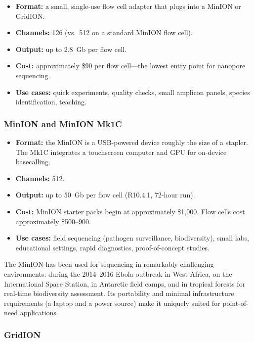 \begin{itemize}[nosep]
  \item \textbf{Format:} a small, single-use flow cell adapter that plugs into a MinION or GridION.
  \item \textbf{Channels:} 126 (vs.\ 512 on a standard MinION flow cell).
  \item \textbf{Output:} up to 2.8~Gb per flow cell.
  \item \textbf{Cost:} approximately \$90 per flow cell---the lowest entry point for nanopore sequencing.
  \item \textbf{Use cases:} quick experiments, quality checks, small amplicon panels, species identification, teaching.
\end{itemize}

\subsubsection{MinION and MinION Mk1C}

\begin{itemize}[nosep]
  \item \textbf{Format:} the MinION is a USB-powered device roughly the size of a stapler. The Mk1C integrates a touchscreen computer and GPU for on-device basecalling.
  \item \textbf{Channels:} 512.
  \item \textbf{Output:} up to 50~Gb per flow cell (R10.4.1, 72-hour run).
  \item \textbf{Cost:} MinION starter packs begin at approximately \$1{,}000. Flow cells cost approximately \$500--900.
  \item \textbf{Use cases:} field sequencing (pathogen surveillance, biodiversity), small labs, educational settings, rapid diagnostics, proof-of-concept studies.
\end{itemize}

\begin{tipbox}[title={Field Sequencing with MinION}]
The MinION has been used for sequencing in remarkably challenging environments: during the 2014--2016 Ebola outbreak in West Africa, on the International Space Station, in Antarctic field camps, and in tropical forests for real-time biodiversity assessment. Its portability and minimal infrastructure requirements (a laptop and a power source) make it uniquely suited for point-of-need applications.
\end{tipbox}

\subsubsection{GridION}

